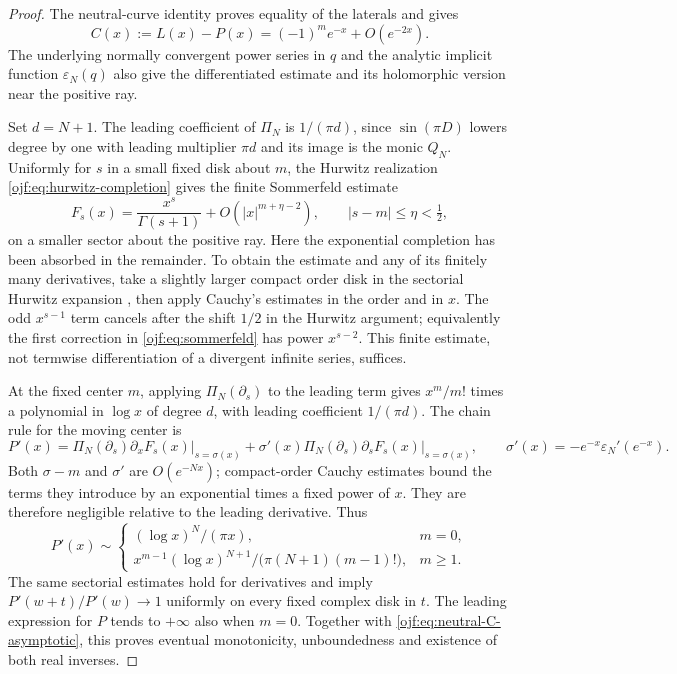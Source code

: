 \begin{proof}
The neutral-curve identity proves equality of the laterals and gives
\begin{equation}\label{ojf:eq:neutral-C-asymptotic}
 C(x):=L(x)-P(x)=(-1)^m e^{-x}+O(e^{-2x}).
\end{equation}
The underlying normally convergent power series in $q$ and the analytic
implicit function $\varepsilon_N(q)$ also give the differentiated
estimate and its holomorphic version near the positive ray.

Set $d=N+1$. The leading coefficient of $\Pi_N$ is $1/(\pi d)$,
since $\sin(\pi D)$ lowers degree by one with leading multiplier
$\pi d$ and its image is the monic $Q_N$. Uniformly for $s$ in a small
fixed disk about $m$, the Hurwitz realization
\eqref{ojf:eq:hurwitz-completion} gives the finite Sommerfeld estimate
\[
 F_s(x)=\frac{x^s}{\Gamma(s+1)}+O(|x|^{m+\eta-2}),
 \qquad |s-m|\le\eta<\tfrac12,
\]
on a smaller sector about the positive ray. Here the exponential
completion has been absorbed in the remainder. To obtain the estimate
and any of its finitely many derivatives, take a slightly larger compact
order disk in the sectorial Hurwitz expansion
\cite[Eq.~25.11.43]{intdist:DLMFHurwitz}, then apply Cauchy's estimates
in the order and in $x$. The odd $x^{s-1}$ term cancels after the shift
$1/2$ in the Hurwitz argument; equivalently the first correction in
\eqref{ojf:eq:sommerfeld} has power $x^{s-2}$. This finite estimate,
not termwise differentiation of a divergent infinite series, suffices.

At the fixed center $m$, applying $\Pi_N(\partial_s)$ to the leading
term gives $x^m/m!$ times a polynomial in $\log x$ of degree $d$,
with leading coefficient $1/(\pi d)$. The chain rule for the moving
center is
\begin{equation}\label{ojf:eq:moving-chain-rule}
 P'(x)=\left.\Pi_N(\partial_s)\partial_xF_s(x)\right|_{s=\sigma(x)}
       +\sigma'(x)\left.\Pi_N(\partial_s)\partial_sF_s(x)
                                                       \right|_{s=\sigma(x)},
 \qquad \sigma'(x)=-e^{-x}\varepsilon_N'(e^{-x}).
\end{equation}
Both $\sigma-m$ and $\sigma'$ are $O(e^{-Nx})$; compact-order
Cauchy estimates bound the terms they introduce by an exponential
times a fixed power of $x$. They are therefore negligible relative to
the leading derivative. Thus
\begin{equation}\label{ojf:eq:neutral-derivative}
 P'(x)\sim
 \begin{cases}
 (\log x)^N/(\pi x),&m=0,\\
 x^{m-1}(\log x)^{N+1}/\bigl(\pi(N+1)(m-1)!\bigr),&m\ge1.
 \end{cases}
\end{equation}
The same sectorial estimates hold for derivatives and imply
$P'(w+t)/P'(w)\to1$ uniformly on every fixed complex disk in $t$.
The leading expression for $P$ tends to $+\infty$ also when $m=0$.
Together with \eqref{ojf:eq:neutral-C-asymptotic}, this proves eventual
monotonicity, unboundedness and existence of both real inverses.


\end{proof}

